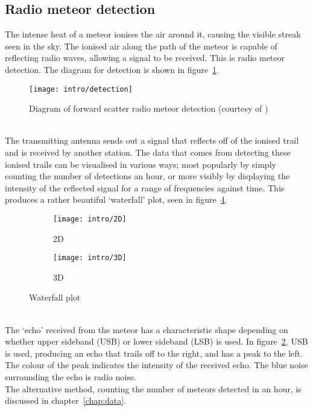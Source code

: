\subsection{Radio meteor detection}
The intense heat of a meteor ionises the air around it, causing the visible streak seen in the sky. The ionised air along the path of the meteor is capable of reflecting radio waves, allowing a signal to be received. This is radio meteor detection. The diagram for detection is shown in figure~\ref{fig:detection}. 
\begin{figure}
	\centering
	\texttt{[image: intro/detection]}
	\caption{Diagram of forward scatter radio meteor detection (courtesy of \cite{forwardscatter})
		\label{fig:detection}}
\end{figure}\\
The transmitting antenna sends out a signal that reflects off of the ionised trail and is received by another station. The data that comes from detecting these ionised trails can be visualised in various ways; most popularly by simply counting the number of detections an hour, or more visibly by displaying the intensity of the reflected signal for a range of frequencies against time. This produces a rather beautiful `waterfall' plot, seen in figure~\ref{fig:waterfall}. 
\begin{figure}[h!]
	\centering
	\begin{subfigure}{.24\textwidth}
		\texttt{[image: intro/2D]}
		\caption{2D\label{fig:waterfall:a}}
	\end{subfigure}
	\begin{subfigure}{.24\textwidth}
		\texttt{[image: intro/3D]}
		\caption{3D \label{fig:waterfall:b}}
	\end{subfigure}
	\caption{Waterfall plot 
	\label{fig:waterfall}}
\end{figure}\\
The `echo' received from the meteor has a characteristic shape depending on whether upper sideband (USB) or lower sideband (LSB) is used. In figure~\ref{fig:waterfall:a}, USB is used, producing an echo that trails off to the right, and has a peak to the left. The colour of the peak indicates the intensity of the received echo. The blue noise surrounding the echo is radio noise.\\
The alternative method, counting the number of meteors detected in an hour, is discussed in chapter~\ref{chap:data}.

